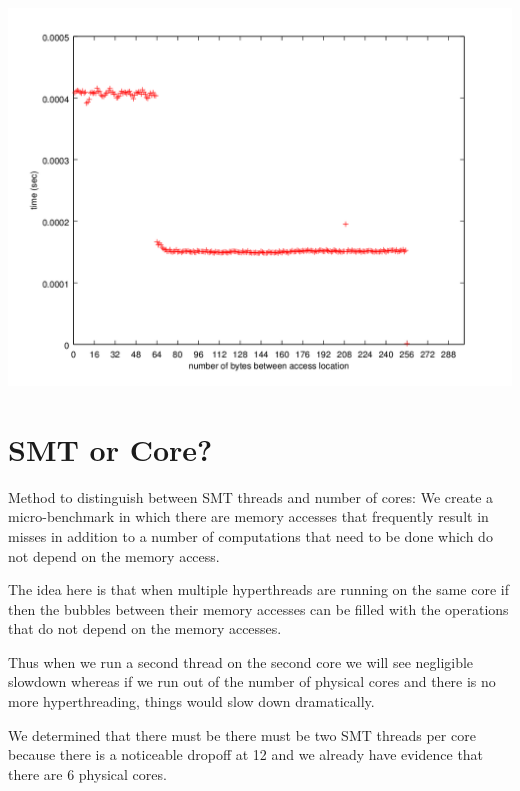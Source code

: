 \documentclass[10pt]{article}
\begin{document}
\begin{center}
\includegraphics[scale=0.50]{images/linesize}
\end{center}

\section*{SMT or Core?}
Method to distinguish between SMT threads and number of cores:
We create a micro-benchmark in which there are memory accesses that frequently
result in misses in addition to a number of computations that need to be done
which do not depend on the memory access.

The idea here is that when multiple hyperthreads are running on the same core if
then the bubbles between their memory accesses can be filled with the
operations that do not depend on the memory accesses.

Thus when we run a second thread on the second core we will see negligible
slowdown whereas if we run out of the number of physical cores and there is no
more hyperthreading, things would slow down dramatically.

We determined that there must be there must be two SMT threads per core because
there is a noticeable dropoff at 12 and we already have evidence that there are
6 physical cores.
\end{document}
